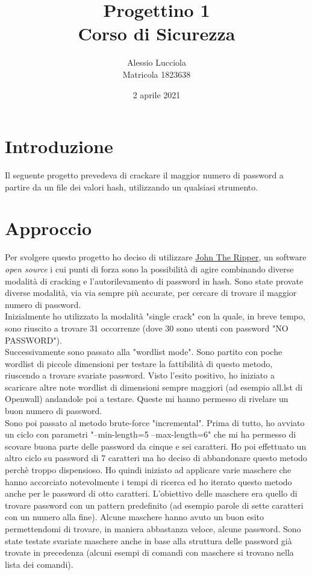 \documentclass[11pt]{article} %
\title{%
 Progettino 1 \\
  \large Corso di Sicurezza}
\author{%
 Alessio Lucciola \\
  \large Matricola 1823638}
\date{2 aprile 2021}
\begin{document}
\maketitle

\newpage

\tableofcontents
\newpage

\section{Introduzione}
Il seguente progetto prevedeva di crackare il maggior numero di password a partire da un file dei valori hash, utilizzando un qualsiasi strumento.

\section{Approccio}
Per svolgere questo progetto ho deciso di utilizzare \href{https://www.openwall.com/john/}{John The Ripper}, un software \textit{open source}  i cui punti di forza sono la possibilità di agire combinando diverse modalità di cracking e l'autorilevamento di password in hash.
\space
Sono state provate diverse modalità, via via sempre più accurate, per cercare di trovare il maggior numero di password. \\
Inizialmente ho utilizzato la modalità "single crack" con la quale, in breve tempo, sono riuscito a trovare 31 occorrenze (dove 30 sono utenti con password "NO PASSWORD"). \\
Successivamente sono passato alla "wordlist mode". Sono partito con poche wordlist di piccole dimensioni per testare la fattibilità di questo metodo, riuscendo a trovare svariate password. Visto l'esito positivo, ho iniziato a scaricare altre note wordlist di dimensioni sempre maggiori (ad esempio all.lst di Openwall) andandole poi a testare. Queste mi hanno permesso di rivelare un buon numero di password. \\
Sono poi passato al metodo brute-force "incremental". Prima di tutto, ho avviato un ciclo con parametri "--min-length=5 --max-length=6" che mi ha permesso di scovare buona parte delle password da cinque e sei caratteri. Ho poi effettuato un altro ciclo su password di 7 caratteri ma ho deciso di abbandonare questo metodo perchè troppo dispensioso. Ho quindi iniziato ad applicare varie maschere che hanno accorciato notevolmente i tempi di ricerca ed ho iterato questo metodo anche per le password di otto caratteri. L'obiettivo delle maschere era quello di trovare password con un pattern predefinito (ad esempio parole di sette caratteri con un numero alla fine). Alcune maschere hanno avuto un buon esito permettendomi di trovare, in maniera abbastanza veloce, alcune password. Sono state testate svariate maschere anche in base alla struttura delle password già trovate in precedenza (alcuni esempi di comandi con maschere si trovano nella lista dei comandi). \\
\end{document}
